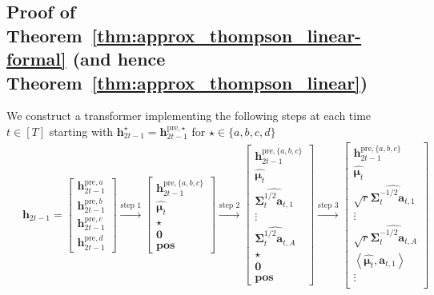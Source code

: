 \documentclass[10pt]{article}
\newcommand{\<}{\left\langle}
\renewcommand{\>}{\right\rangle}
\newcommand{\bzero}{{\mathbf 0}}
\newcommand{\pre}{{\mathrm{pre}}}
\newcommand{\posv}{{\mathbf{pos}}}
\newcommand{\parta}{{a}}
\newcommand{\partb}{{b}}
\newcommand{\partc}{{c}}
\newcommand{\partd}{{d}}
\newcommand{\Tpsmean}{{{\mathbf\mu}}}
\newcommand{\Tpscov}{{{\mathbf\Sigma}}}
\newcommand{\Tpsparn}{{r}}
\def\ba{{\mathbf a}}
\def\bh{{\mathbf h}}
\begin{document}
\subsection{Proof of Theorem~\ref{thm:approx_thompson_linear-formal} (and hence Theorem~\ref{thm:approx_thompson_linear}) }\label{sec:pf_thm:approx_thompson_linear-formal}
We construct a transformer implementing the following steps at each time $t\in[T]$ starting with $\bh^{\star}_{2t-1}=\bh^{\pre,\star}_{2t-1}$ for $\star\in\{\parta,\partb,\partc,\partd\}$
\begin{align}\label{eq:roadmap_ts}
   &~ \bh_{2t-1}=
    \begin{bmatrix}
    \bh_{2t-1}^{\pre,\parta} \\  \bh_{2t-1}^{\pre,\partb}\\  \bh_{2t-1}^{\pre,\partc}\\   \bh_{2t-1}^{\pre,\partd}
\end{bmatrix}
\xrightarrow{\text{step 1}}
   \begin{bmatrix}
    \bh_{2t-1}^{\pre,\{\parta,\partb,\partc\}} \\
        \widehat{\Tpsmean_t}\\ \star\\ \bzero \\\posv
\end{bmatrix}
\xrightarrow{\text{step 2}}
   \begin{bmatrix}
    \bh_{2t-1}^{\pre,\{\parta,\partb,\partc\}}\\\widehat{\Tpsmean_t}
        \\
\widehat{\Tpscov_t^{1/2}\ba_{t,1}}
\\\vdots\\
         \widehat{\Tpscov_t^{1/2}\ba_{t,A}}\\
        \star\\ \bzero \\\posv
\end{bmatrix}
\xrightarrow{\text{step 3}}
   \begin{bmatrix}
    \bh_{2t-1}^{\pre,\{\parta,\partb,\partc\}}\\\widehat{\Tpsmean_t}
        \\
 \sqrt{\Tpsparn}\widehat{\Tpscov_t^{-1/2}\ba_{t,1}}
\\\vdots\\
        \sqrt{\Tpsparn} \widehat{\Tpscov_t^{-1/2}\ba_{t,A}}\\
        \<\widehat{\Tpsmean_t},\ba_{t,1}\>\\\vdots\\

\end{bmatrix}
\end{align}
\end{document}

